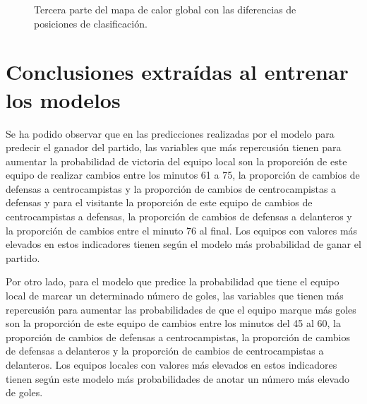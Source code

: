 \begin{figure}[H]
    \centering
    \caption{Tercera parte del mapa de calor global con las diferencias de posiciones de clasificación. }
    \label{fig:tercera-calor}
\end{figure}












\section{Conclusiones extraídas al entrenar los modelos}




Se ha podido observar que en las predicciones realizadas por el modelo para predecir el ganador 
del partido, las variables que más repercusión tienen para aumentar la probabilidad de victoria del
equipo local son la proporción de este equipo de realizar cambios entre los minutos 61 a 75, la
proporción de cambios de defensas a centrocampistas y la proporción de cambios de
centrocampistas a defensas y para el visitante la proporción de este equipo de cambios de
centrocampistas a defensas, la proporción de cambios de defensas a delanteros y la proporción de 
cambios entre el minuto 76 al final. Los equipos con valores más elevados en estos indicadores 
tienen según el modelo más probabilidad de ganar el partido.

Por otro lado, para el modelo que predice la probabilidad que tiene el equipo local de marcar un 
determinado número de goles, las variables que tienen más repercusión para aumentar las 
probabilidades de que el equipo marque más goles son la proporción de este equipo de cambios 
entre los minutos del 45 al 60, la proporción de cambios de defensas a centrocampistas, la 
proporción de cambios de defensas a delanteros y la proporción de cambios de centrocampistas a 
delanteros. Los equipos locales con valores más elevados en estos indicadores tienen según este 
modelo más probabilidades de anotar un número más elevado de goles.

